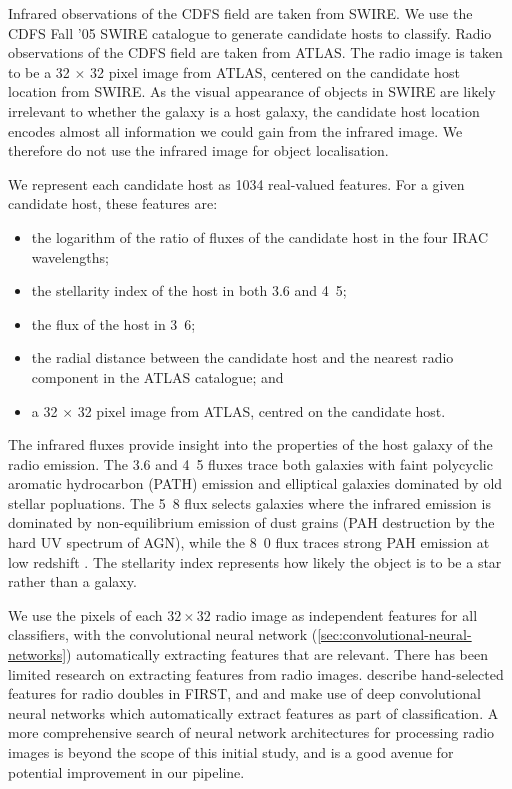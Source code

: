\documentclass[fleqn,usenatbib,usedcolumn]{mnras}
\begin{document}
    Infrared observations of the CDFS field are taken from SWIRE. We use the
    CDFS Fall '05 SWIRE catalogue \citep{surace05swire} to generate candidate
    hosts to classify. Radio observations of the CDFS field are taken from
    ATLAS. The radio image is taken to be a 32 $\times$ 32 pixel image from
    ATLAS, centered on the candidate host location from SWIRE.
    As the visual appearance of objects in SWIRE are likely irrelevant to
    whether the galaxy is a host galaxy, the candidate host location encodes
    almost all information we could gain from the infrared image. We therefore
    do not use the infrared image for object localisation.

    We represent each candidate host as 1034 real-valued features. For a given
    candidate host, these features are:
    \begin{itemize}
      \item the logarithm of the ratio of fluxes of the candidate host in the
        four IRAC wavelengths;
      \item the stellarity index of the host in both 3.6 and
        \unit{4.5}{\micro\meter};
      \item the flux of the host in \unit{3.6}{\micro\meter};
      \item the radial distance between the candidate host and the nearest
        radio component in the ATLAS catalogue; and
      \item a 32 $\times$ 32 pixel image from ATLAS, centred on the candidate
        host.
    \end{itemize}

    The infrared fluxes provide insight into the properties of the host galaxy
    of the radio emission. The 3.6 and \unit{4.5}{\micro\meter} fluxes trace
    both galaxies with faint polycyclic aromatic hydrocarbon (PATH) emission and
    elliptical galaxies dominated by old stellar popluations. The
    \unit{5.8}{\micro\meter} flux selects galaxies where the infrared emission
    is dominated by non-equilibrium emission of dust grains (PAH destruction by
    the hard UV spectrum of AGN), while the \unit{8.0}{\micro\meter} flux traces
    strong PAH emission at low redshift \citep{citeneeded}. The stellarity index
    represents how likely the object is to be a star rather than a galaxy.

    We use the pixels of each $32 \times 32$ radio image as
    independent features for all classifiers, with the convolutional neural
    network (\autoref{sec:convolutional-neural-networks}) automatically
    extracting features that are relevant.
    There has been limited research on extracting features from radio images.
    \citet{proctor06} describe hand-selected features for radio doubles in
    FIRST, and \citet{aniyan17cnn} and \citet{lukic17compact} make use of deep
    convolutional neural networks which automatically extract features as part
    of classification. A more comprehensive search of neural network architectures
    for processing radio images is beyond the scope of this initial study,
    and is a good avenue for potential improvement in our pipeline.
\end{document}
